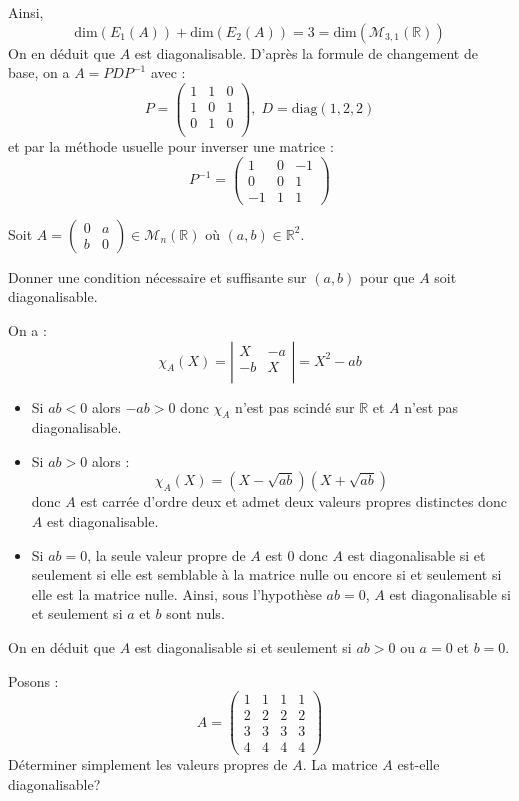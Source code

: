\documentclass[a4paper,10pt]{report}
\begin{document}
Ainsi,
$$ \textrm{dim}(E_1(A))+ \textrm{dim}(E_2(A)) = 3 = \textrm{dim}(\mathcal{M}_{3,1}(\mathbb{R}))$$
On en déduit que $A$ est diagonalisable. D'après la formule de changement de base, on a $A = PDP^{-1}$ avec :
$$ P = \begin{pmatrix}
1 & 1 & 0\\
1 & 0 & 1 \\
0 & 1 & 0 \\
\end{pmatrix}, \; D=\textrm{diag}(1,2,2)$$
et par la méthode usuelle pour inverser une matrice :
$$ P^{-1} =  \begin{pmatrix}
1 & 0 & -1 \\
0 & 0 & 1 \\
-1 & 1 & 1 
\end{pmatrix}$$

\begin{Exa} Soit $A= \begin{pmatrix}
0 & a \\
b & 0
\end{pmatrix} \in \mathcal{M}_n(\mathbb{R})$ où $(a,b) \in \mathbb{R}^2$. 

Donner une condition nécessaire et suffisante sur $(a,b)$ pour que $A$ soit diagonalisable.
\end{Exa}

\corr On a :
$$ \chi_A(X) = \left\vert \begin{array}{cc}
X & -a \\
-b & X \\
\end{array}\right\vert = X^2-ab$$
\begin{itemize}
\item Si $ab<0$ alors $-ab>0$ donc $\chi_A$ n'est pas scindé sur $\mathbb{R}$ et $A$ n'est pas diagonalisable.
\item Si $ab>0$ alors :
$$ \chi_A(X) = (X- \sqrt{ab}) (X+ \sqrt{ab})$$
donc $A$ est carrée d'ordre deux et admet deux valeurs propres distinctes donc $A$ est diagonalisable.
\item Si $ab=0$, la seule valeur propre de $A$ est $0$ donc $A$ est diagonalisable si et seulement si elle est semblable à la matrice nulle ou encore si et seulement si elle est la matrice nulle. Ainsi, sous l'hypothèse $ab=0$, $A$ est diagonalisable si et seulement si $a$ et $b$ sont nuls.
\end{itemize}
On en déduit que $A$ est diagonalisable si et seulement si $ab>0$ ou $a=0$ et $b=0$.

\begin{Exa} Posons :
    \[
    A =
    \begin{pmatrix}
      1 & 1 & 1 & 1 \\
      2 & 2 & 2 & 2 \\
      3 & 3 & 3 & 3 \\
      4 & 4 & 4 & 4
    \end{pmatrix}
    \]
Déterminer simplement les valeurs propres de $A$. La matrice $A$ est-elle diagonalisable?
\end{Exa}
\end{document}
